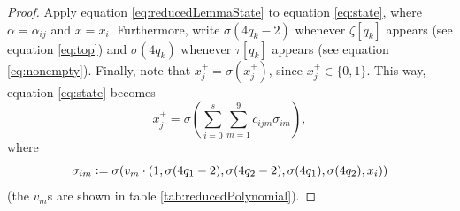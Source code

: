 \documentclass{book}
\newcommand{\defeq}{\vcentcolon=}
\theoremstyle{definition}
\theoremstyle{plain}
\theoremstyle{plain}
\theoremstyle{remark}
\theoremstyle{plain}
\begin{document}
	\begin{proof}
		Apply equation \ref{eq:reducedLemmaState} to equation \ref{eq:state}, where $\alpha=\alpha_{ij}$ and $x=x_i$. Furthermore, write $\sigma(4q_k-2)$ whenever $\zeta[q_k]$ appears (see equation \ref{eq:top}) and $\sigma(4q_k)$ whenever $\tau[q_k]$ appears (see equation \ref{eq:nonempty}). Finally, note that $x_j^+=\sigma\!\left(x_j^+\right)$, since $x_j^+\in\{0,1\}$. This way, equation \ref{eq:state} becomes
		\begin{equation} \label{eq:netState}
			x_j^+=\sigma\!\left(\sum_{i=0}^{s}\sum_{m=1}^{9}c_{ijm}\sigma_{im}\right),
		\end{equation}
		where
		\begin{equation} \label{eq:sigma_im}
			\sigma_{im}\defeq\sigma(v_m\cdot(1,\sigma(4q_1-2),\sigma(4q_2-2),\sigma(4q_1),\sigma(4q_2),x_i))
		\end{equation}
		(the $v_m$s are shown in table \ref{tab:reducedPolynomial}).
		

\end{proof}
\end{document}
